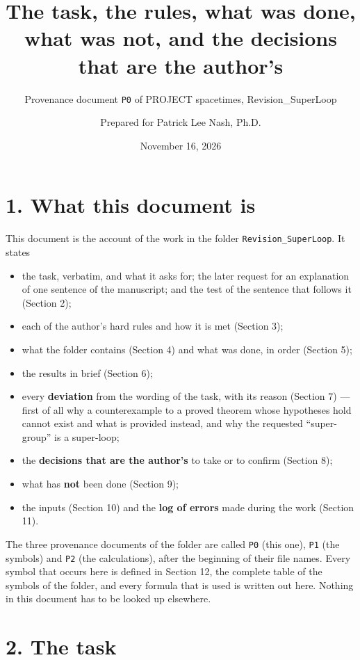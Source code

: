 \documentclass[
  10pt,
]{article}
\title{The task, the rules, what was done, what was not, and the
decisions that are the author's}
\subtitle{Provenance document \texttt{P0} of PROJECT spacetimes,
Revision\_SuperLoop}
\author{Prepared for Patrick Lee Nash, Ph.D.}
\date{November 16, 2026}
\providecommand{\tightlist}{%
  \setlength{\itemsep}{0pt}\setlength{\parskip}{0pt}}
\begin{document}
\maketitle

\hypertarget{what-this-document-is}{%
\section{1. What this document is}\label{what-this-document-is}}

This document is the account of the work in the folder
\texttt{Revision\_SuperLoop}. It states

\begin{itemize}
\tightlist
\item
  the task, verbatim, and what it asks for; the later request for an
  explanation of one sentence of the manuscript; and the test of the
  sentence that follows it (Section 2);
\item
  each of the author's hard rules and how it is met (Section 3);
\item
  what the folder contains (Section 4) and what was done, in order
  (Section 5);
\item
  the results in brief (Section 6);
\item
  every \textbf{deviation} from the wording of the task, with its reason
  (Section 7) --- first of all why a counterexample to a proved theorem
  whose hypotheses hold cannot exist and what is provided instead, and
  why the requested ``super-group'' is a super-loop;
\item
  the \textbf{decisions that are the author's} to take or to confirm
  (Section 8);
\item
  what has \textbf{not} been done (Section 9);
\item
  the inputs (Section 10) and the \textbf{log of errors} made during the
  work (Section 11).
\end{itemize}

The three provenance documents of the folder are called \texttt{P0}
(this one), \texttt{P1} (the symbols) and \texttt{P2} (the
calculations), after the beginning of their file names. Every symbol
that occurs here is defined in Section 12, the complete table of the
symbols of the folder, and every formula that is used is written out
here. Nothing in this document has to be looked up elsewhere.

\hypertarget{the-task}{%
\section{2. The task}\label{the-task}}
\end{document}
